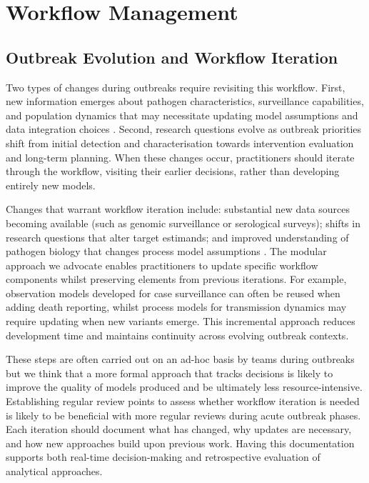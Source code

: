 \documentclass{article}
\begin{document}
\section{Workflow Management}

\subsection{Outbreak Evolution and Workflow Iteration}  \label{sec:outbreak}
Two types of changes during outbreaks require revisiting this workflow.
First, new information emerges about pathogen characteristics, surveillance capabilities, and population dynamics that may necessitate updating model assumptions and data integration choices \citep{mccaw2023role}.
Second, research questions evolve as outbreak priorities shift from initial detection and characterisation towards intervention evaluation and long-term planning.
When these changes occur, practitioners should iterate through the workflow, visiting their earlier decisions, rather than developing entirely new models.

Changes that warrant workflow iteration include: substantial new data sources becoming available (such as genomic surveillance or serological surveys); shifts in research questions that alter target estimands; and improved understanding of pathogen biology that changes process model assumptions \citep{knock2021key}.
The modular approach we advocate enables practitioners to update specific workflow components whilst preserving elements from previous iterations.
For example, observation models developed for case surveillance can often be reused when adding death reporting, whilst process models for transmission dynamics may require updating when new variants emerge.
This incremental approach reduces development time and maintains continuity across evolving outbreak contexts.

These steps are often carried out on an ad-hoc basis by teams during outbreaks but we think that a more formal approach that tracks decisions is likely to improve the quality of models produced and be ultimately less resource-intensive.
Establishing regular review points to assess whether workflow iteration is needed is likely to be beneficial with more regular reviews during acute outbreak phases.
Each iteration should document what has changed, why updates are necessary, and how new approaches build upon previous work.
Having this documentation supports both real-time decision-making and retrospective evaluation of analytical approaches.
\end{document}
